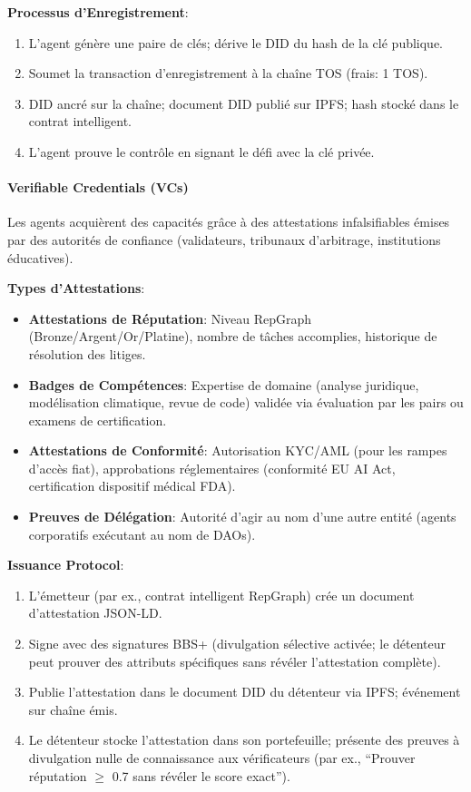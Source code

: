 \documentclass[11pt]{article}
\begin{document}
\textbf{Processus d'Enregistrement}:
\begin{enumerate}[noitemsep]
  \item L'agent génère une paire de clés; dérive le DID du hash de la clé publique.
  \item Soumet la transaction d'enregistrement à la chaîne TOS (frais: 1 TOS).
  \item DID ancré sur la chaîne; document DID publié sur IPFS; hash stocké dans le contrat intelligent.
  \item L'agent prouve le contrôle en signant le défi avec la clé privée.
\end{enumerate}

\paragraph{Verifiable Credentials (VCs)}
Les agents acquièrent des capacités grâce à des attestations infalsifiables émises par des autorités de confiance (validateurs, tribunaux d'arbitrage, institutions éducatives).

\textbf{Types d'Attestations}:
\begin{itemize}[noitemsep]
  \item \textbf{Attestations de Réputation}: Niveau RepGraph (Bronze/Argent/Or/Platine), nombre de tâches accomplies, historique de résolution des litiges.
  \item \textbf{Badges de Compétences}: Expertise de domaine (analyse juridique, modélisation climatique, revue de code) validée via évaluation par les pairs ou examens de certification.
  \item \textbf{Attestations de Conformité}: Autorisation KYC/AML (pour les rampes d'accès fiat), approbations réglementaires (conformité EU AI Act, certification dispositif médical FDA).
  \item \textbf{Preuves de Délégation}: Autorité d'agir au nom d'une autre entité (agents corporatifs exécutant au nom de DAOs).
\end{itemize}

\textbf{Issuance Protocol}:
\begin{enumerate}[noitemsep]
  \item L'émetteur (par ex., contrat intelligent RepGraph) crée un document d'attestation JSON-LD.
  \item Signe avec des signatures BBS+ (divulgation sélective activée; le détenteur peut prouver des attributs spécifiques sans révéler l'attestation complète).
  \item Publie l'attestation dans le document DID du détenteur via IPFS; événement sur chaîne émis.
  \item Le détenteur stocke l'attestation dans son portefeuille; présente des preuves à divulgation nulle de connaissance aux vérificateurs (par ex., ``Prouver réputation $\geq$ 0.7 sans révéler le score exact'').
\end{enumerate}
\end{document}
